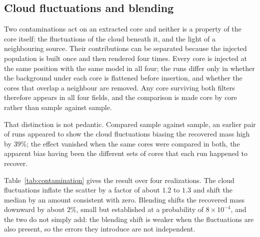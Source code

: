 \documentclass{aa}
\begin{document}
\subsection{Cloud fluctuations and blending}
\label{sec:contamination}

Two contaminations act on an extracted core and neither is a property of the
core itself: the fluctuations of the cloud beneath it, and the light of a
neighbouring source. Their contributions can be separated because the injected
population is built once and then rendered four times. Every core is injected
at the same position with the same model in all four; the runs differ only in
whether the background under each core is flattened before insertion, and
whether the cores that overlap a neighbour are removed. Any core surviving both
filters therefore appears in all four fields, and the comparison is made core
by core rather than sample against sample.

That distinction is not pedantic. Compared sample against sample, an earlier
pair of runs appeared to show the cloud fluctuations biasing the recovered mass
high by $39\%$; the effect vanished when the same cores were compared in both,
the apparent bias having been the different sets of cores that each run
happened to recover.

Table~\ref{tab:contamination} gives the result over four realizations. The
cloud fluctuations inflate the scatter by a factor of about $1.2$ to $1.3$ and
shift the median by an amount consistent with zero. Blending shifts the
recovered mass downward by about $2\%$, small but established at a probability
of $8\times10^{-4}$, and the two do not simply add: the blending shift is
weaker when the fluctuations are also present, so the errors they introduce are
not independent.
\end{document}
